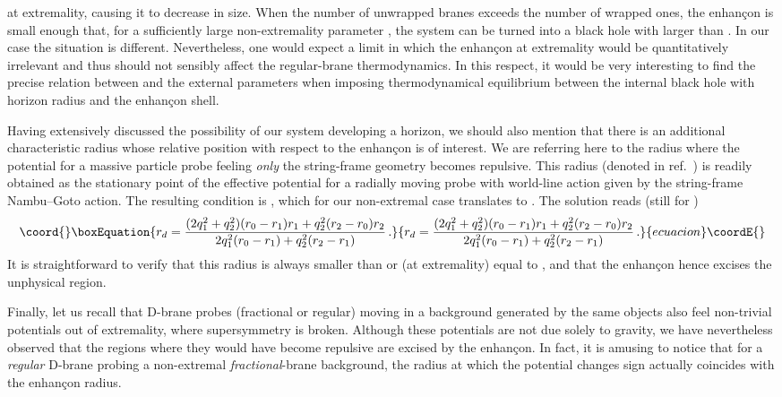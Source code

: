 \documentclass[a4paper,11pt]{article}
\begin{document}
at extremality, causing it to decrease in size. When the number of
unwrapped branes exceeds the number of wrapped ones, the enhan\c{c}on
is small enough that, for a sufficiently large non-extremality
parameter \coordHE{}, the system can be turned into a black hole with
\coordHE{} larger than \coordHE{}. In our case the situation is different.
Nevertheless, one would expect a limit \coordHE{} in which the
enhan\c{c}on at extremality would be quantitatively irrelevant and
thus should not sensibly affect the regular-brane thermodynamics. In
this respect, it would be very interesting to find the precise relation
between \coordHE{} and the external parameters when imposing thermodynamical
equilibrium between the internal black hole with horizon radius \coordHE{}
and the enhan\c{c}on shell.

Having extensively discussed the possibility of our system developing a
horizon, we should also mention that there is an additional characteristic
radius whose relative position with respect to the enhan\c{c}on is of
interest. We are referring here to the radius where the potential for a
massive particle probe feeling \emph{only} the string-frame geometry becomes
repulsive. This radius (denoted \coordHE{} in ref.~\cite{Johnson:2001wm}) is
readily obtained as the stationary point of the effective potential for
a radially moving probe with world-line action given by the string-frame
Nambu--Goto action. The resulting condition is
\coordHE{}, which for our non-extremal case
translates to \coordHE{}. The solution reads (still for \coordHE{})
\begin{equation}\coord{}\boxEquation{
r_d = \frac{(2q_1^2+q_2^2)(r_0-r_1)r_1 + q_2^2(r_2-r_0)r_2}{2q_1^2
(r_0-r_1)+q_2^2(r_2-r_1)} \,.
}{
r_d = \frac{(2q_1^2+q_2^2)(r_0-r_1)r_1 + q_2^2(r_2-r_0)r_2}{2q_1^2
(r_0-r_1)+q_2^2(r_2-r_1)} \,.
}{ecuacion}\coordE{}\end{equation}
It is straightforward to verify that this radius is always smaller than
or (at extremality) equal to \coordHE{}, and that the enhan\c{c}on hence excises
the unphysical region.

Finally, let us recall that D\coordHE{}-brane probes (fractional or regular)
moving in a background generated by the same objects also feel non-trivial
potentials out of extremality, where supersymmetry is broken. Although
these potentials are not due solely to gravity, we have nevertheless
observed that the regions where they would have become repulsive are excised
by the enhan\c{c}on. In fact, it is amusing to notice that for a
\emph{regular} D\coordHE{}-brane probing a non-extremal \emph{fractional}-brane
background, the radius at which the potential changes sign actually
coincides with the enhan\c{c}on radius.
\end{document}
